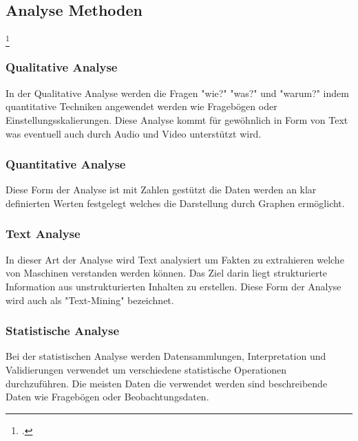 		\subsection{Analyse Methoden} \footcite{analyse-methode}
		
			\subsubsection{Qualitative Analyse}
				In der Qualitative Analyse werden die Fragen "wie?" "was?" und "warum?" indem quantitative Techniken angewendet werden  wie Fragebögen oder Einstellungsskalierungen. Diese Analyse kommt für gewöhnlich in Form von Text was eventuell auch durch Audio und Video unterstützt wird. 
				
			\subsubsection{Quantitative Analyse}
				Diese Form der Analyse ist mit Zahlen gestützt die Daten werden an klar definierten Werten festgelegt welches die Darstellung durch Graphen ermöglicht. 
				
			\subsubsection{Text Analyse}
				In dieser Art der Analyse wird Text analysiert um Fakten zu extrahieren welche von Maschinen verstanden werden können. Das Ziel darin liegt strukturierte Information aus unstrukturierten Inhalten zu erstellen. Diese Form der Analyse wird auch als "Text-Mining" bezeichnet.
			
			\subsubsection{Statistische Analyse}
				Bei der statistischen Analyse werden Datensammlungen, Interpretation und Validierungen verwendet um verschiedene statistische Operationen durchzuführen. Die meisten Daten die verwendet werden sind beschreibende Daten wie Fragebögen oder Beobachtungsdaten. 
			
